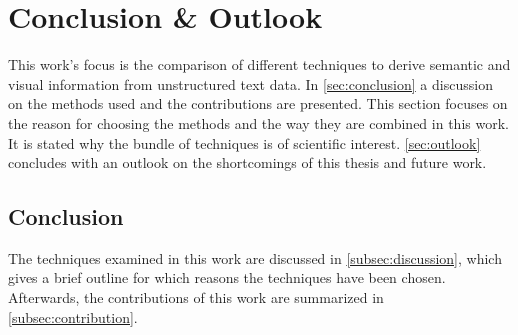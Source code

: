 \chapter{Conclusion \& Outlook}\label{ch:conclusion-outlook}

This work's focus is the comparison of different techniques to derive semantic and visual information from unstructured text data.
In \autoref{sec:conclusion} a discussion on the methods used and the contributions are presented.
This section focuses on the reason for choosing the methods and the way they are combined in this work.
It is stated why the bundle of techniques is of scientific interest.
\autoref{sec:outlook} concludes with an outlook on the shortcomings of this thesis and future work.

\section{Conclusion}\label{sec:conclusion}

The techniques examined in this work are discussed in \autoref{subsec:discussion}, 
which gives a brief outline for which reasons the techniques have been chosen.
Afterwards, the contributions of this work are summarized in \autoref{subsec:contribution}.







